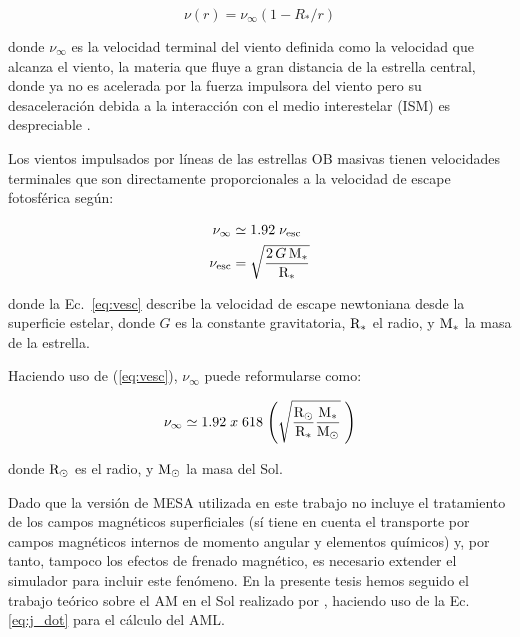 \begin{ceqn}
\begin{equation}
    \nu(r) = \nu_\infty (1-R_*/r) \label{eq:vel_law}
\end{equation}
\end{ceqn}
donde $\nu_\infty$ es la velocidad terminal del viento definida como la velocidad que alcanza el viento, la materia que fluye a gran distancia de la estrella central, donde ya no es acelerada por la fuerza impulsora del viento pero su desaceleración debida a la interacción con el medio interestelar (ISM) es despreciable \cite{Niedzielski2002}.\par

Los vientos impulsados por líneas de las estrellas OB masivas tienen velocidades terminales que son directamente proporcionales a la velocidad de escape fotosférica \cite{Lamers2000} según:\par

\begin{ceqn}
\begin{align}
    \nu_\infty &\simeq 1.92 \;\nu_{\textrm{esc}} \label{eq:vinf}\\
    \nu_{\textrm{esc}} &= \sqrt{\frac{2\,G\,\mathrm{M}_*}{\mathrm{R}_*}} \label{eq:vesc}
\end{align}
\end{ceqn}

donde la Ec.~\ref{eq:vesc} describe la velocidad de escape newtoniana desde la superficie estelar, donde $G$ es la constante gravitatoria, ${\mathrm{R}_*}$ el radio, y ${\mathrm{M}_*}$ la masa de la estrella.

Haciendo uso de (\ref{eq:vesc}), $\nu_\infty$ puede reformularse como:
\begin{ceqn}
\begin{equation}
    \nu_\infty \simeq 1.92 \; x \; 618 \; \Bigg(\sqrt{\frac{\mathrm{R}_\odot}{\mathrm{R}_*}\frac{\mathrm{M}_*}{\mathrm{M}_\odot}} \;\Bigg) \label{eq:vinf}
\end{equation}
\end{ceqn}
donde ${\mathrm{R}_\odot}$ es el radio, y ${\mathrm{M}_\odot}$ la masa del Sol.


Dado que la versión de MESA utilizada en este trabajo no incluye el tratamiento de los campos magnéticos superficiales (sí tiene en cuenta el transporte por campos magnéticos internos de momento angular y elementos químicos) y, por tanto, tampoco los efectos de frenado magnético, es necesario extender el simulador para incluir este fenómeno. En la presente tesis hemos seguido el trabajo teórico sobre el AM en el Sol realizado por \cite{Weber1967}, haciendo uso de la Ec.~ \ref{eq:j_dot} para el cálculo del AML.\par

